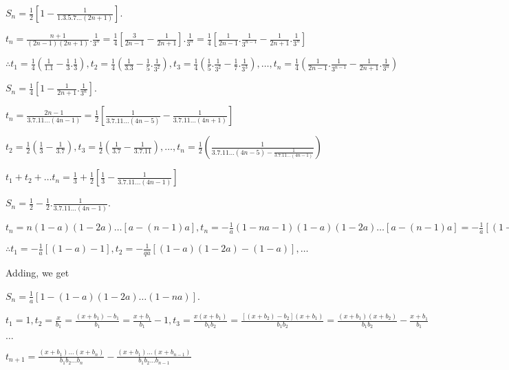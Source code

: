   $S_n = \frac{1}{2}\left[1 - \frac{1}{1.3.5.7\ldots (2n + 1)}\right]$.
\item $t_n = \frac{n + 1}{(2n - 1)(2n + 1)}.\frac{1}{3^n} = \frac{1}{4}\left[\frac{3}{2n - 1} - \frac{1}{2n
    + 1}\right].\frac{1}{3^n} = \frac{1}{4}\left[\frac{1}{2n - 1}.\frac{1}{3^{n - 1}} - \frac{1}{2n +
    1}.\frac{1}{3^n}\right]$

  $\therefore t_1 = \frac{1}{4}\left(\frac{1}{1.1} - \frac{1}{3}.\frac{1}{3}\right), t_2 =
  \frac{1}{4}\left(\frac{1}{3.3} - \frac{1}{5}.\frac{1}{3^2}\right), t_3 =
  \frac{1}{4}\left(\frac{1}{5}.\frac{1}{3^2} - \frac{1}{7}.\frac{1}{3^3}\right),\ldots,t_n =
  \frac{1}{4}\left(\frac{1}{2n - 1}.\frac{1}{3^{n - 1}} - \frac{1}{2n + 1}.\frac{1}{3^n}\right)$

  $S_n = \frac{1}{4}\left[1 - \frac{1}{2n + 1}.\frac{1}{3^n}\right]$.
\item $t_n = \frac{2n - 1}{3.7.11\ldots (4n - 1)} = \frac{1}{2}\left[\frac{1}{3.7.11\ldots (4n - 5)} -
    \frac{1}{3.7.11\ldots (4n + 1)}\right]$

  $t_2 = \frac{1}{2}\left(\frac{1}{3} - \frac{1}{3.7}\right), t_3 = \frac{1}{2}\left(\frac{1}{3.7} -
  \frac{1}{3.7.11}\right),\ldots,t_n = \frac{1}{2}\left(\frac{1}{3.7.11\ldots(4n - 5) -
    \frac{1}{3.7.11\ldots(4n - 1)}}\right)$

  $t_1 + t_2 + \ldots t_n = \frac{1}{3} + \frac{1}{2}\left[\frac{1}{3} - \frac{1}{3.7.11\ldots (4n -
    1)}\right]$

  $S_n = \frac{1}{2} - \frac{1}{2}.\frac{1}{3.7.11\ldots(4n - 1)}$.
\item $t_n = n(1 - a)(1 - 2a)\ldots [a - (n - 1)a], t_n = -\frac{1}{a}(1 - na - 1)(1 - a)(1 - 2a)\ldots [a -
  (n - 1)a] = -\frac{1}{a}[(1 - a)(1 - 2a)\ldots(1 - na) - (1 - a)(1 -2a)\ldots\{a + (n - 1)a\}]$

  $\therefore t_1 = -\frac{1}{a}[(1 - a) - 1], t_2 = -\frac{1}{qa}[(1 - a)(1 - 2a) - (1 - a)], \ldots$

  Adding, we get

  $S_n = \frac{1}{a}[1 - (1 - a)(1 - 2a)\ldots(1 - na)]$.
\item   $t_1 = 1, t_2 = \frac{x}{b_1} = \frac{(x + b_1) - b_1}{b_1} = \frac{x+ b_1}{b_1} - 1, t_3 =
  \frac{x(x + b_1)}{b_1b_2} = \frac{[(x + b_2) - b_2](x + b_1)}{b_1b_2} = \frac{(x + b_1)(x + b_2)}{b_1b_2}
  - \frac{x + b_1}{b_1}$

  $\ldots$

  $t_{n+1} = \frac{(x + b_1)\ldots (x+b_n)}{b_1b_2\ldots b_n} - \frac{(x+b_1)\ldots(x+b_{n -
      1})}{b_1b_2\ldots b_{n - 1}}$

